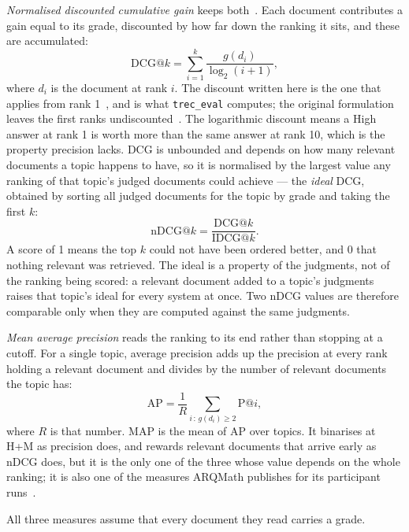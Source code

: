 \emph{Normalised discounted cumulative gain} keeps both~\cite{jarvelin2002cumulated}.
Each document contributes a gain equal to its grade, discounted by how far down the
ranking it sits, and these are accumulated:
\begin{equation}
\mathrm{DCG}@k = \sum_{i=1}^{k} \frac{g(d_i)}{\log_2 (i+1)} ,
\end{equation}
where $d_i$ is the document at rank $i$. The discount written here is the one that
applies from rank 1~\cite{burges2005learning}, and is what \texttt{trec\_eval}
computes; the original formulation leaves the first ranks
undiscounted~\cite{jarvelin2002cumulated}. The logarithmic discount means a High
answer at rank 1 is worth more than the same answer at rank 10, which is the
property precision lacks. DCG is unbounded and depends on how many relevant
documents a topic happens to have, so it is normalised by the largest value any
ranking of that topic's judged documents could achieve --- the \emph{ideal} DCG,
obtained by sorting all judged documents for the topic by grade and taking the
first $k$:
\begin{equation}
\mathrm{nDCG}@k = \frac{\mathrm{DCG}@k}{\mathrm{IDCG}@k} .
\end{equation}
A score of 1 means the top $k$ could not have been ordered better, and 0 that
nothing relevant was retrieved. The ideal is a property of the judgments, not of the
ranking being scored: a relevant document added to a topic's judgments raises that
topic's ideal for every system at once. Two nDCG values are therefore comparable only
when they are computed against the same judgments.

\emph{Mean average precision} reads the ranking to its end rather than stopping at
a cutoff. For a single topic, average precision adds up the precision at every rank
holding a relevant document and divides by the number of relevant documents the
topic has:
\begin{equation}
\mathrm{AP} = \frac{1}{R} \sum_{i \,:\, g(d_i) \geq 2} \mathrm{P}@i ,
\end{equation}
where $R$ is that number. MAP is the mean of AP over topics. It binarises at H+M as
precision does, and rewards relevant documents that arrive early as nDCG does, but
it is the only one of the three whose value depends on the whole ranking; it is
also one of the measures ARQMath publishes for its participant
runs~\cite{mansouri2022arqmath3}.

All three measures assume that every document they read carries a grade.

